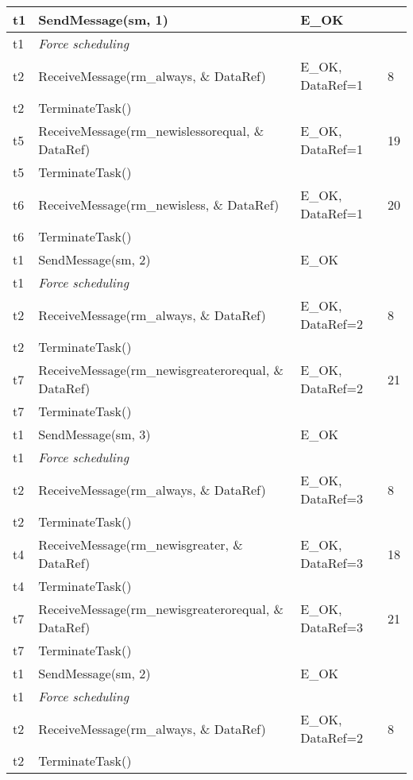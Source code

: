 \documentclass[10pt]{article}
\newlength{\Li}\settowidth{\Li}{Running}
\newlength{\Lii}\setlength{\Lii}{7cm}
\newlength{\Liiii}\setlength{\Liiii}{0.9cm}
\newlength{\Liii}\setlength{\Liii}{\textwidth} \addtolength{\Liii}{-\Li} \addtolength{\Liii}{-\Lii} \addtolength{\Liii}{-\Liiii}
\begin{document}
	\begin{supertabular}{|p{\Li}|p{\Lii}|p{\Liii}|p{\Liiii}|} \hline 
	t1	& SendMessage(sm, 1)										& E\_OK				& \\ \hline
	t1	& \textit{Force scheduling}									& 					& \\ \hline
	t2	& ReceiveMessage(rm\_always, \& DataRef)						& E\_OK, DataRef=1		& 8 \\ \hline
	t2	& TerminateTask()											& 					&\\ \hline	
	t5	& ReceiveMessage(rm\_newislessorequal, \& DataRef)				& E\_OK, DataRef=1		& 19 \\ \hline
	t5	& TerminateTask()											& 					&\\ \hline
	t6	& ReceiveMessage(rm\_newisless, \& DataRef)					& E\_OK, DataRef=1		& 20 \\ \hline
	t6	& TerminateTask()											& 					&\\ \hline
	
	t1	& SendMessage(sm, 2)										& E\_OK				& \\ \hline
	t1	& \textit{Force scheduling}									& 					& \\ \hline
	t2	& ReceiveMessage(rm\_always, \& DataRef)						& E\_OK, DataRef=2		& 8 \\ \hline
	t2	& TerminateTask()											& 					&\\ \hline	
	t7	& ReceiveMessage(rm\_newisgreaterorequal, \& DataRef)			& E\_OK, DataRef=2		& 21 \\ \hline
	t7	& TerminateTask()											& 					&\\ \hline	
	
	t1	& SendMessage(sm, 3)										& E\_OK				& \\ \hline
	t1	& \textit{Force scheduling}									& 					& \\ \hline
	t2	& ReceiveMessage(rm\_always, \& DataRef)						& E\_OK, DataRef=3		& 8 \\ \hline
	t2	& TerminateTask()											& 					&\\ \hline	
	t4	& ReceiveMessage(rm\_newisgreater, \& DataRef)					& E\_OK, DataRef=3		& 18 \\ \hline
	t4	& TerminateTask()											& 					&\\ \hline
	t7	& ReceiveMessage(rm\_newisgreaterorequal, \& DataRef)			& E\_OK, DataRef=3		& 21 \\ \hline
	t7	& TerminateTask()											& 					&\\ \hline	
			
	t1	& SendMessage(sm, 2)										& E\_OK				& \\ \hline
	t1	& \textit{Force scheduling}									& 					& \\ \hline
	t2	& ReceiveMessage(rm\_always, \& DataRef)						& E\_OK, DataRef=2		& 8 \\ \hline
	t2	& TerminateTask()											& 					&\\ \hline	


\end{supertabular}
\end{document}
